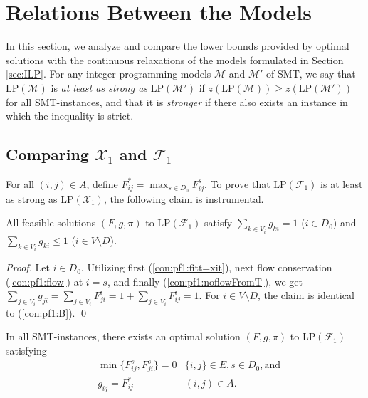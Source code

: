 \section{Relations Between the Models}
\label{sec:comp}

In this section, we analyze and compare the lower bounds provided by optimal solutions with the continuous relaxations of the models formulated in Section \ref{sec:ILP}.
For any integer programming models $\mathcal{M}$ and $\mathcal{M}'$ of SMT, we say that $\text{LP}(\mathcal{M})$ is \emph{at least as strong as} $\text{LP}(\mathcal{M}')$ if
$z\left(\text{LP}(\mathcal{M})\right)\geq z\left(\text{LP}(\mathcal{M}')\right)$ for all SMT-instances,
and that it is \emph{stronger} if there also exists an instance in which the inequality is strict.

\subsection{Comparing $\mathcal{X}_1$ and $\mathcal{F}_1$}
For all $(i,j)\in A$, define $F_{ij}^*=\max_{s\in D_0}F_{ij}^s$.
To prove that $\text{LP}(\mathcal{F}_1)$ is at least as strong as $\text{LP}(\mathcal{X}_1)$, the following claim is instrumental.
 
\begin{lemma} \label{lem:lpf1feas}
All feasible solutions $(F,g,\pi)$ to $\text{LP}(\mathcal{F}_1)$ satisfy $\sum_{k\in V_i}g_{ki}=1$ ($i\in D_0$) and $\sum_{k\in V_i}g_{ki}\leq 1$ ($i\in V\setminus D$).
\end{lemma}
\begin{proof}
Let $i\in D_0$. Utilizing first (\ref{con:pf1:fitt=xit}), next flow conservation (\ref{con:pf1:flow}) at $i=s$, and finally (\ref{con:pf1:noflowFromT}), we get
$\sum_{j\in V_i}g_{ji}=\sum_{j\in V_i}F_{ji}^i = 1+\sum_{j\in V_i}F_{ij}^i=1.$
For $i\in V\setminus D$, the claim is identical to (\ref{con:pf1:B}). \qed
\end{proof}
 
\begin{lemma} \label{lem:lpf1opt}
In all SMT-instances, there exists an optimal solution $(F,g,\pi)$ to $\text{LP}(\mathcal{F}_1)$ satisfying
\begin{subequations}
\begin{align}
 & \min\{F_{ij}^s, F_{ji}^s\} = 0 & \{i,j\}\in E, s\in D_0, \text{and} \label{eq:lemlpf1a} \\
 & g_{ij} = F_{ij}^* & (i,j)\in A. \label{eq:lemlpf1b}
\end{align}
\end{subequations}
\end{lemma}

